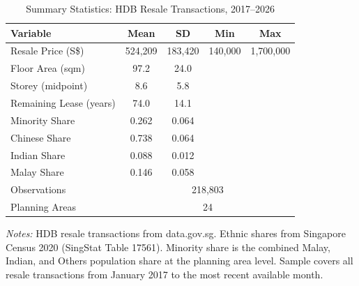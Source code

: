 \begin{table}[t]
\centering
\caption{Summary Statistics: HDB Resale Transactions, 2017--2026}
\label{tab:summary}
\begin{tabular}{lcccc}
\hline\hline
Variable & Mean & SD & Min & Max \\
\hline
Resale Price (S\$) & 524,209 & 183,420 & 140,000 & 1,700,000 \\
Floor Area (sqm) & 97.2 & 24.0 & & \\
Storey (midpoint) & 8.6 & 5.8 & & \\
Remaining Lease (years) & 74.0 & 14.1 & & \\
Minority Share & 0.262 & 0.064 & & \\
Chinese Share & 0.738 & 0.064 & & \\
Indian Share & 0.088 & 0.012 & & \\
Malay Share & 0.146 & 0.058 & & \\
\hline
Observations & \multicolumn{4}{c}{218,803} \\
Planning Areas & \multicolumn{4}{c}{24} \\
\hline\hline
\end{tabular}
\begin{tablenotes}[flushleft]\small
\item \textit{Notes:} HDB resale transactions from data.gov.sg. Ethnic shares from Singapore Census 2020 (SingStat Table 17561). Minority share is the combined Malay, Indian, and Others population share at the planning area level. Sample covers all resale transactions from January 2017 to the most recent available month.
\end{tablenotes}
\end{table}

